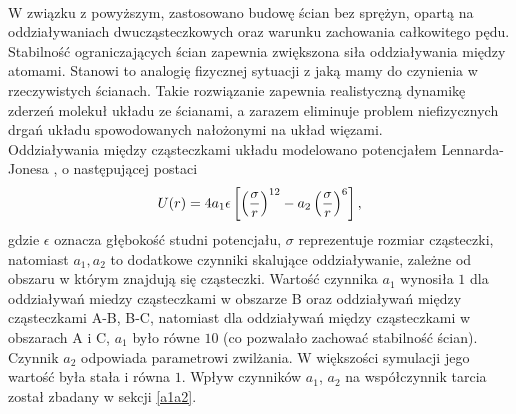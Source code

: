 \documentclass[12pt,a4paper,openright]{report} %
\begin{document}
\\
W związku z powyższym, zastosowano budowę ścian bez sprężyn, opartą na oddziaływaniach dwucząsteczkowych oraz warunku zachowania całkowitego pędu. Stabilność ograniczających ścian zapewnia zwiększona siła oddziaływania między atomami. Stanowi to analogię fizycznej sytuacji z jaką mamy do czynienia w rzeczywistych ścianach. Takie rozwiązanie zapewnia realistyczną dynamikę zderzeń molekuł układu ze ścianami, a zarazem eliminuje problem niefizycznych drgań układu spowodowanych nałożonymi na układ więzami.
\\
Oddziaływania między cząsteczkami układu modelowano potencjałem Lennarda-Jonesa \cite{AllenTildesley}, o następującej postaci
%
\begin{equation}
U(r)=4 a_1 \epsilon \left[ \left( \sigma \over r \right)^{12} - a_2 \left( \sigma \over r \right)^{6} \right],
\label{LJPOT}
\end{equation} 
gdzie $\epsilon$ oznacza głębokość studni potencjału, $\sigma$ reprezentuje rozmiar cząsteczki, natomiast $a_1, a_2$ to dodatkowe czynniki skalujące oddziaływanie, zależne od obszaru w którym znajdują się cząsteczki. Wartość czynnika $a_1$ wynosiła $1$ dla oddziaływań miedzy cząsteczkami w obszarze B oraz oddziaływań między cząsteczkami A-B, B-C, natomiast dla oddziaływań między cząsteczkami w obszarach A i C, $a_1$ było równe $10$ (co pozwalało zachować stabilność ścian). Czynnik $a_2$ odpowiada parametrowi zwilżania. W większości symulacji jego wartość była stała i równa $1$. Wpływ czynników $a_1$, $a_2$ na współczynnik tarcia został zbadany w sekcji \ref{a1a2}. 
%
%
\end{document}
